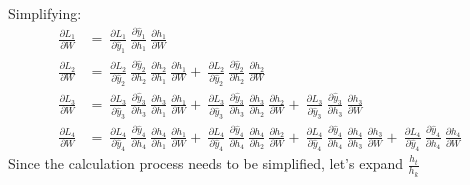 \documentclass{article}
\begin{document}
Simplifying:
\begin{align*}
\frac{\partial L_1}{ \partial{W}} & = ~\frac{\partial L_1}{ \partial \hat{y}_1}~\frac{\partial \hat{y}_1}{ \partial h_1}
  ~\frac{\partial h_1}{ \partial W} \\
	\frac{\partial L_2}{ \partial{W}} & = ~\frac{\partial L_2}{ \partial \hat{y}_2}~\frac{\partial \hat{y}_2}{ \partial h_2}
 ~\frac{\partial h_2}{ \partial h_1} ~\frac{\partial h_1}{ \partial W}	+ ~\frac{\partial L_2}{ \partial \hat{y}_2}~\frac{\partial \hat{y}_2}{ \partial h_2}
  ~\frac{\partial h_2}{ \partial W} \\
 \frac{\partial L_3}{ \partial{W}} & = ~\frac{\partial L_3}{ \partial \hat{y}_3}~\frac{\partial \hat{y}_3}{ \partial h_3}
 ~\frac{\partial h_3}{ \partial h_1} ~\frac{\partial h_1}{ \partial W}	+ ~\frac{\partial L_3}{ \partial \hat{y}_3}~\frac{\partial \hat{y}_3}{ \partial h_3}
 ~\frac{\partial h_3}{ \partial h_2} ~\frac{\partial h_2}{ \partial W} +  ~\frac{\partial L_3}{ \partial \hat{y}_3}~\frac{\partial \hat{y}_3}{ \partial h_3}
  ~\frac{\partial h_3}{ \partial W} \\
 \frac{\partial L_4}{ \partial{W}} & = ~\frac{\partial L_4}{ \partial \hat{y}_4}~\frac{\partial \hat{y}_4}{ \partial h_4}
 ~\frac{\partial h_4}{ \partial h_1} ~\frac{\partial h_1}{ \partial W}	+ ~\frac{\partial L_4}{ \partial \hat{y}_4}~\frac{\partial \hat{y}_4}{ \partial h_4}
 ~\frac{\partial h_4}{ \partial h_2} ~\frac{\partial h_2}{ \partial W} +  ~\frac{\partial L_4}{ \partial \hat{y}_4}~\frac{\partial \hat{y}_4}{ \partial h_4}
 ~\frac{\partial h_4}{ \partial h_3} ~\frac{\partial h_3}{ \partial W} + ~\frac{\partial L_4}{ \partial \hat{y}_4}~\frac{\partial \hat{y}_4}{ \partial h_4}
  ~\frac{\partial h_4}{ \partial W}
\end{align*}
Since the calculation process needs to be simplified, let's expand $\frac{h_t}{h_k}$
\end{document}
